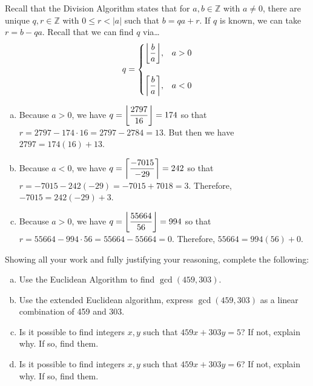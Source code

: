 \documentclass[11pt,letterpaper]{article}
\begin{document}
\sol Recall that the Division Algorithm states that for $a, b \in \mathbb{Z}$ with $a \neq 0$, there are unique $q, r \in \mathbb{Z}$ with $0 \leq r < |a|$ such that $b= qa + r$. If $q$ is known, we can take $r= b - qa$. Recall that we can find $q$ via\dots
	\[
	q= 
	\begin{cases}
	\floor*{\dfrac{b}{a}}, & a > 0 \\
	\\
	\ceil*{\dfrac{b}{a}}, & a < 0
	\end{cases}
	\]

\begin{enumerate}[(a)]
\item Because $a > 0$, we have $q= \floor*{\dfrac{2797}{16}}= 174$ so that $r= 2797 - 174 \cdot 16= 2797 - 2784= 13$. But then we have $2797= 174(16) + 13$. \pspace

\item Because $a < 0$, we have $q= \ceil*{\dfrac{-7015}{-29}}= 242$ so that $r= -7015 - 242(-29)= -7015 + 7018= 3$. Therefore, $-7015= 242(-29) + 3$. \pspace

\item Because $a > 0$, we have $q= \floor*{\dfrac{55664}{56}}= 994$ so that $r= 55664 - 994 \cdot 56= 55664 - 55664= 0$. Therefore, $55664= 994(56) + 0$. 
\end{enumerate}



\newpage



 Showing all your work and fully justifying your reasoning, complete the following: 
	\begin{enumerate}[(a)]
	\item Use the Euclidean Algorithm to find $\gcd(459, 303)$. 
	\item Use the extended Euclidean algorithm, express $\gcd(459, 303)$ as a linear combination of 459 and 303. 
	\item Is it possible to find integers $x, y$ such that $459x + 303y= 5$? If not, explain why. If so, find them.  
	\item Is it possible to find integers $x, y$ such that $459x + 303y= 6$? If not, explain why. If so, find them.  
	\end{enumerate} \pspace
\end{document}
